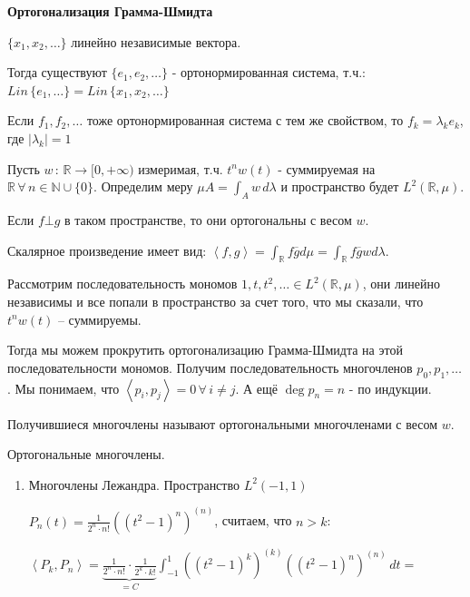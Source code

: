 \begin{remark}
    \textbf{Ортогонализация Грамма-Шмидта}

    $\{ x_1, x_2, \ldots \}$ линейно независимые вектора.

    Тогда существуют $\{ e_1, e_2, \ldots  \}$ - ортонормированная система, т.ч.:
    $Lin \, \{ e_1, \ldots \} = Lin \, \{ x_1, x_2, \ldots \}$

    Если $f_1, f_2, \ldots$ тоже ортонормированная система с тем же свойством, то
    $f_k = \lambda_k e_k$, где $|\lambda_k| = 1$

    \begin{remark}
        Пусть $w \, : \, \mathbb{R} \rightarrow [0, +\infty)$ измеримая,
        т.ч. $t^n w(t)$ - суммируемая на $\mathbb{R} \, \forall \, n \in \mathbb{N} \cup \{0\}$. Определим меру $\mu A = \int_A w \, d\lambda$ и пространство будет $L^2 (\mathbb{R}, \mu)$.

        Если $f \bot g$ в таком пространстве, то они ортогональны с весом $w$.

        Скалярное произведение имеет вид: $\left< f, g \right> = \int_{\mathbb{R}} f \overline{g} d \mu = \int_{\mathbb{R}} f \overline{g} w d \lambda$.

        Рассмотрим последовательность мономов $1, t, t^2, \ldots \in L^2 (\mathbb{R}, \mu)$, они линейно независимы и все попали в пространство за счет того, что мы сказали, что $t^n w(t)$ -- суммируемы.

        Тогда мы можем прокрутить ортогонализацию Грамма-Шмидта на этой последовательности мономов. Получим последовательность многочленов $p_0, p_1, \ldots$.
        Мы понимаем, что $\left < p_i, p_j \right > = 0 \, \forall \, i \neq j$. А ещё $\deg p_n = n$ - по индукции.

        Получившиеся многочлены называют ортогональными многочленами с весом $w$.

        \begin{example}
            Ортогональные многочлены.

            \begin{enumerate}
                \item {
                    Многочлены Лежандра. Пространство $L^2 (-1, 1)$

                    $P_n (t) = \frac{1}{2^n \cdot n!} ((t^2 - 1)^n)^{(n)}$, считаем, что $n > k$:

                    $\left < P_k, P_n \right > = \underbrace{\frac{1}{2^n \cdot n!} \cdot \frac{1}{2^k \cdot k!}}_{=C} \int_{-1}^1 ((t^2 - 1)^k)^{(k)} ((t^2 - 1)^n)^{(n)} \, dt =$

}
\end{enumerate}
\end{example}
\end{remark}
\end{remark}
